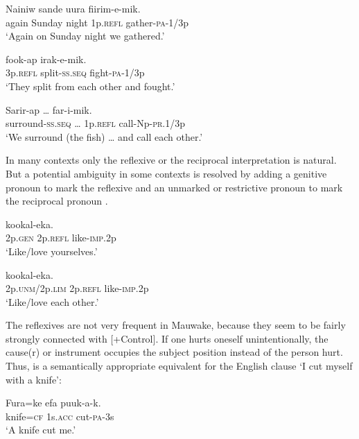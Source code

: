 \ea%
\label{ex:3:x1865}
\gll Nainiw sande uura  fiirim-e-mik. \\
again Sunday night 1p.\textsc{refl} gather-\textsc{pa}-1/3p\\
\glt`Again on Sunday night we gathered.'
\z

\ea%
\label{ex:3:x612}
\gll {} fook-ap irak-e-mik. \\
3p.\textsc{refl} split-\textsc{ss}.\textsc{seq} fight-\textsc{pa}-1/3p\\
\glt`They split from each other and fought.'
\z

\ea%
\label{ex:3:x1866}
\gll Sarir-ap {\dots }  far-i-mik. \\
surround-\textsc{ss}.\textsc{seq} {\dots} 1p.\textsc{refl} call-Np-\textsc{pr}.1/3p\\
\glt`We surround (the fish) {\dots} and call each other.'
\z

In many contexts only the reflexive or the reciprocal interpretation is natural. But a potential ambiguity in some contexts is resolved by adding a genitive pronoun to mark the reflexive  and an unmarked or restrictive pronoun to mark the reciprocal pronoun .

\ea%
\label{ex:3:x614}
\gll {}  kookal-eka. \\
2p.\textsc{gen} 2p.\textsc{refl} like-\textsc{imp}.2p\\
\glt`Like/love yourselves.'
\z

\ea%
\label{ex:3:x613}
\gll {}  kookal-eka. \\
2p.\textsc{unm}/2p.\textsc{lim} 2p.\textsc{refl} like-\textsc{imp}.2p\\
\glt`Like/love each other.'
\z

The reflexives are not very frequent in Mauwake, because they seem to be fairly strongly connected with [+Control]. If one hurts oneself unintentionally, the cause(r) or instrument occupies the subject position instead of the person hurt. Thus,  is a semantically appropriate equivalent for the English clause `I cut myself with a knife':

\ea%
\label{ex:3:x617}
\gll Fura=ke efa puuk-a-k. \\
knife=\textsc{cf} 1s.\textsc{acc} cut-\textsc{pa}-3s\\
\glt`A knife cut me.'
\z

